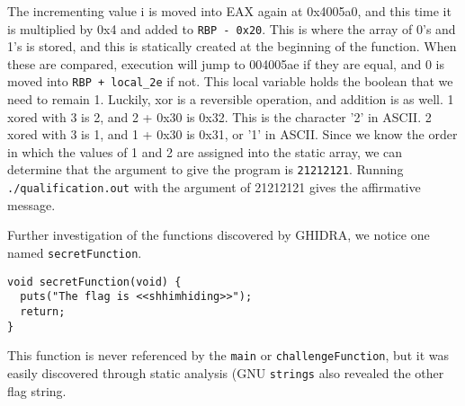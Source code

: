 The incrementing value i is moved into EAX again at 0x4005a0, and this time it is multiplied by 0x4 and added to \texttt{RBP - 0x20}. This is where the array of 0's and 1's is stored, and this is statically created at the beginning of the function. When these are compared, execution will jump to 004005ae if they are equal, and 0 is moved into \texttt{RBP + local\_2e} if not. This local variable holds the boolean that we need to remain 1. Luckily, xor is a reversible operation, and addition is as well. 1 xored with 3 is 2, and 2 + 0x30 is 0x32. This is the character '2' in ASCII. 2 xored with 3 is 1, and 1 + 0x30 is 0x31, or '1' in ASCII. Since we know the order in which the values of 1 and 2 are assigned into the static array, we can determine that the argument to give the program is \texttt{21212121}.
Running \texttt{./qualification.out} with the argument of 21212121 gives the affirmative message.

Further investigation of the functions discovered by GHIDRA, we notice one named \texttt{secretFunction}.

\begin{lstlisting}
void secretFunction(void) {
  puts("The flag is <<shhimhiding>>");
  return;
}
\end{lstlisting}

This function is never referenced by the \texttt{main} or \texttt{challengeFunction}, but it was easily discovered through static analysis (GNU \texttt{strings} also revealed the other flag string.
